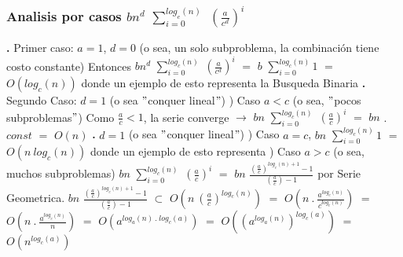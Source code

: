 \documentclass[10pt,a4paper]{article}
\begin{document}
\subsubsection{Analisis por casos $bn^{d}$ $\displaystyle \sum_{i=0}^{log_{c}(n)}$ $(\displaystyle \frac{a}{c^{d}})^{i}$}

\textbf{.} Primer caso: $a = 1$, $d = 0$ (o sea, un solo subproblema, la combinación tiene costo constante) 
\newline
\newline
Entonces $bn^{d}$ $\displaystyle \sum_{i=0}^{log_{c}(n)}$ $(\displaystyle \frac{a}{c^{d}})^{i}$ $=$ $b$ $\displaystyle \sum_{i=0}^{log_{c}(n)} 1$ $=$ $O(log_{c}(n))$ donde un ejemplo de esto representa la Busqueda Binaria 
\newline
\newline
\newline
\textbf{.} Segundo Caso: $d = 1$ (o sea $"$conquer lineal$"$) 
\newline
{}) Caso $a < c$ (o sea, $"$pocos subproblemas$"$) 
\newline
\newline
Como $\displaystyle \frac{a}{c} < 1$, la serie converge $\rightarrow$ $bn$ $\displaystyle \sum_{i=0}^{log_{c}(n)}$ $(\displaystyle \frac{a}{c})^{i}$ $=$ $bn$ . $const$ $=$ $O(n)$ 
\newline
\newline
\textbf{.} $d = 1$ (o sea $"$conquer lineal$"$) 
\newline
{}) Caso $a = c$, $bn$ $\displaystyle \sum_{i=0}^{log_{c}(n)} 1$ $=$ $O(n~log_{c}(n))$ donde un ejemplo de esto representa
\newline
\newline
{}) Caso $a > c$ (o sea, muchos subproblemas)
\newline
\newline
$bn$ $\displaystyle \sum_{i=0}^{log_{c}(n)}$ $(\displaystyle \frac{a}{c})^{i}$ $=$ $bn$ $\displaystyle \frac{(\displaystyle \frac{a}{c})^{log_{c}(n) + 1} - 1}{(\displaystyle \frac{a}{c})-1}$ por Serie Geometrica.
\newline
\newline
\newline
$bn$ $\displaystyle \frac{(\displaystyle \frac{a}{c})^{log_{c}(n) + 1} - 1}{(\displaystyle \frac{a}{c})-1}$ $\subset$ $O(n~(\displaystyle \frac{a}{c})^{log_{c}(n)})$ $=$ $O(n~.~\displaystyle \frac{a^{log_{c}(n)}}{c^{log_{c}(n)}})$ $=$ $O(n~.~\displaystyle \frac{a^{log_{c}(n)}}{n})$ $=$ $O(a^{log_{a}(n)~.~log_{c}(a)})$ $=$ $O((a^{log_{a}(n)})^{log_{c}(a)})$ $=$ $O(n^{log_{c}(a)})$ 
\end{document}
